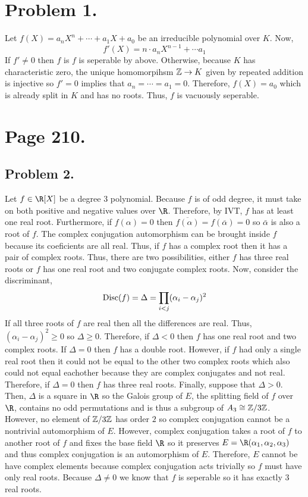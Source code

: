 \documentclass[12pt]{extarticle}
\begin{document}

\section*{Problem 1.}

Let $f(X) = a_n X^n + \cdots + a_1 X + a_0$ be an irreducible polynomial over $K$. Now, \[f'(X) = n \cdot a_n X^{n-1} + \cdots a_1\] If $f' \neq 0$ then $f$ is $f$ is seperable by above. Otherwise, because $K$ has characteristic zero, the unique homomorpihsm $\mathbb{Z} \to K$ given by repeated addition is injective so $f' = 0$ implies that $a_n = \cdots= a_1 = 0$. Therefore, $f(X) = a_0$ which is already split in $K$ and has no roots. Thus, $f$ is vacuously seperable.  

\section*{Page 210.}
\subsection*{Problem 2.}

Let $f \in \R[X]$ be a degree $3$ polynomial. Because $f$ is of odd degree, it must take on both positive and negative values over $\R$. Therefore, by IVT, $f$ has at least one real root. Furthermore, if $f(\alpha) = 0$ then $\overline{f(\alpha)} = f(\overline{\alpha}) = 0$ so $\bar{\alpha}$ is also a root of $f$. The complex conjugation automorphism can be brought inside $f$ because its coeficients are all real. Thus, if $f$ has a complex root then it has a pair of complex roots. Thus, there are two possibilities, either $f$ has three real roots or $f$ has one real root and two conjugate complex roots. Now, consider the discriminant,
\[\mathrm{Disc}(f) = \Delta = \prod\limits_{i < j} (\alpha_i - \alpha_j)^2\]
If all three roots of $f$ are real then all the differences are real. Thus, $(\alpha_i - \alpha_j)^2 \ge 0$ so $\Delta \ge 0$. Therefore, if $\Delta < 0$ then $f$ has one real root and two complex roots. If $\Delta = 0$ then $f$ has a double root. However, if $f$ had only a single real root then it could not be equal to the other two complex roots which also could not equal eachother because they are complex conjugates and not real. Therefore, if $\Delta = 0$ then $f$ has three real roots. Finally, suppose that $\Delta > 0$. Then, $\Delta$ is a square in $\R$ so the Galois group of $E$, the splitting field of $f$ over $\R$, contains no odd permutations and is thus a subgroup of $A_3 \cong \mathbb{Z}/3\mathbb{Z}$. However, no element of $\mathbb{Z}/3\mathbb{Z}$ has order $2$ so complex conjugation cannot be a nontrivial automorphism of $E$. However, complex conjugation takes a root of $f$ to another root of $f$ and fixes the base field $\R$ so it preserves $E = \R(\alpha_1, \alpha_2, \alpha_3)$ and thus complex conjugation is an automorphism of $E$. Therefore, $E$ cannot be have complex elements because complex conjugation acts trivially so $f$ must have only real roots. Because $\Delta \neq 0$ we know that $f$ is seperable so it has exactly 3 real roots.  
\end{document}
